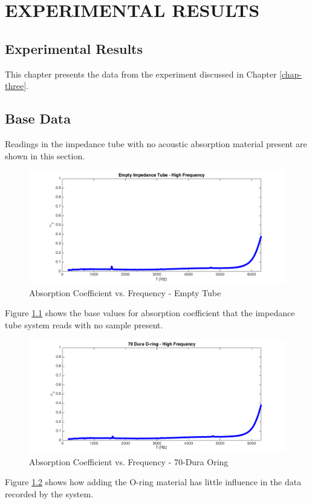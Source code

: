\chapter{EXPERIMENTAL RESULTS}
\label{chap-four}

\section{Experimental Results}

This chapter presents the data from the experiment discussed in Chapter \ref{chap-three}.

\section{Base Data}
Readings in the impedance tube with no acoustic absorption material present are shown in this section.

\begin{figure}[hbtp]
    \centering
    \includegraphics[width=1\textwidth]{Chapter-4/figs/Afigempty}
    \caption{Absorption Coefficient vs. Frequency - Empty Tube}
    \label{fig:Afigempty}
\end{figure}

Figure \ref{fig:Afigempty} shows the base values for absorption coefficient that the impedance tube system reads with no sample present.

\begin{figure}[hbtp]
    \centering
    \includegraphics[width=1\textwidth]{Chapter-4/figs/AfigOring}
    \caption{Absorption Coefficient vs. Frequency - 70-Dura Oring}
    \label{fig:AfigOring}
\end{figure}
\clearpage
Figure \ref{fig:AfigOring} shows how adding the O-ring material has little influence in the data recorded by the system.

